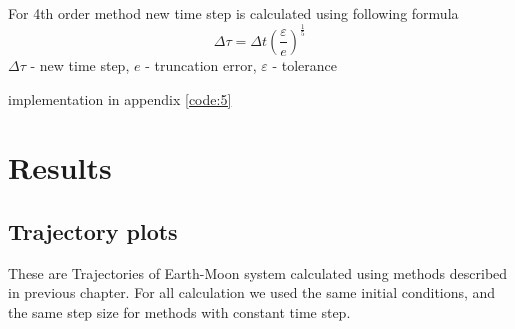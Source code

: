 \documentclass[english,12pt,a4paper, notitlepage]{report}
\begin{document}
	For 4th order method new time step is calculated using following formula
	\begin{equation}
		\Delta \tau = \Delta t \left( \dfrac{\varepsilon}{e} \right) ^{\frac{1}{5}}
	\end{equation}
	$\Delta \tau$ - new time step, $e$ - truncation error, $\varepsilon$ - tolerance
	
	implementation in appendix \ref{code:5}
	
	\chapter{Results}
	
	\section{Trajectory plots}
	\graphicspath{ {./pictures/} }
	
	These are Trajectories of Earth-Moon system calculated using methods described in previous chapter. For all calculation we used the same initial conditions, and the same step size for methods with constant time step.
	
\end{document}
